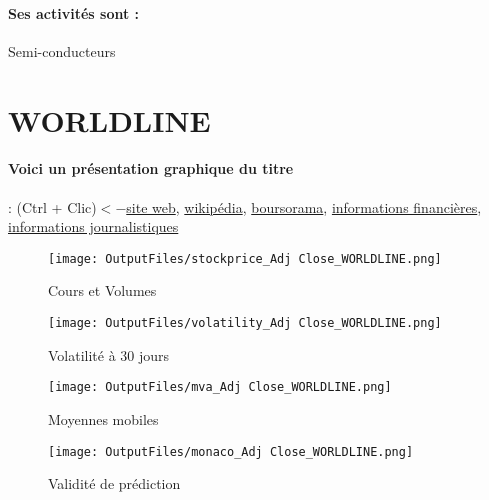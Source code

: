 \documentclass[11pt,a4paper]{report}%
\begin{document}
\paragraph{Ses activités sont : } Semi-conducteurs 
    
    \newpage

\section{WORLDLINE}

\paragraph{Voici un présentation graphique du titre} : (Ctrl + Clic)$<-$\href{https://fr.worldline.com/fr/home/investisseurs.html}{site web}, \href{https://fr.wikipedia.org/wiki/Worldline}{wikipédia}, \href{https://www.boursorama.com/cours/1rPWLN}{boursorama}, \href{https://www.qwant.com/?q=site:https:%2f%2fwww.easybourse.com%2faction-societe%2fWORLDLINE&t=web&client=ext-firefox-hp}{informations financières}, \href{https://bourse.lerevenu.com/cours-de-bourse/fiche-valeur-synthese/WORLDLINE/WLN-FR}{informations journalistiques}
\begin{figure}[!htb]
   \begin{minipage}{0.5\textwidth}
     \centering
     \texttt{[image: OutputFiles/stockprice\_Adj Close\_WORLDLINE.png]}
     \caption{Cours et Volumes}\label{Fig:price_WORLDLINE}
   \end{minipage}\hfill
   \begin{minipage}{0.5\textwidth}
     \centering
     \texttt{[image: OutputFiles/volatility\_Adj Close\_WORLDLINE.png]}
     \caption{Volatilité à 30 jours}\label{Fig:volat_WORLDLINE}
   \end{minipage}
\end{figure}
\begin{figure}[!htb]
   \begin{minipage}{0.5\textwidth}
     \centering
     \texttt{[image: OutputFiles/mva\_Adj Close\_WORLDLINE.png]}
     \caption{Moyennes mobiles}\label{Fig:mva_WORLDLINE}
   \end{minipage}\hfill
   \begin{minipage}{0.5\textwidth}
     \centering
     \texttt{[image: OutputFiles/monaco\_Adj Close\_WORLDLINE.png]}
     \caption{Validité de prédiction}\label{Fig:prediction_WORLDLINE}
   \end{minipage}
\end{figure}
\end{document}
